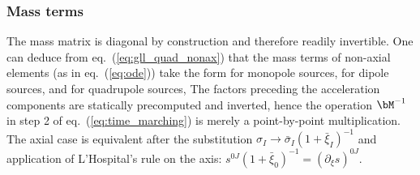 \subsubsection{Mass terms}\label{section:mass}
%
The mass matrix is diagonal by construction 
and therefore readily invertible. One can deduce from 
eq.~(\ref{eq:gll_quad_nonax}) that the mass terms of non-axial elements
(as in eq.~(\ref{eq:ode})) take the form for monopole sources, 
%
\eqa
{}
\ena
for dipole sources,
\eqa
{}
\ena
%
and for quadrupole sources,
\eqa
{}
\ena
%
The factors preceding the acceleration components are statically precomputed 
and inverted, hence the operation $\bM^{-1}$ in step 2 of 
eq.~(\ref{eq:time_marching}) is merely a point-by-point multiplication. 
The axial case is equivalent after the substitution
$\sigma_I\rightarrow\bar{\sigma}_I(1+\bar{\xi}_I)^{-1}$ and application of 
L'Hospital's rule on the axis: 
$s^{0J}(1+\bar{\xi}_0)^{-1}=\left(\partial_\xi s\right)^{0J}$.
%
%
